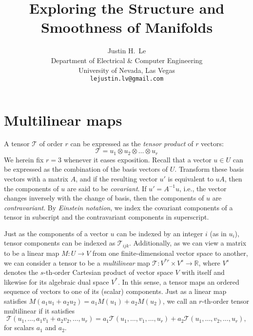 \documentclass{article}
\title{Exploring the Structure and Smoothness of Manifolds}
\author{
    Justin H.~Le \\
    Department of Electrical \& Computer Engineering \\
    University of Nevada, Las Vegas \\
  \texttt{lejustin.lv@gmail.com} \\
}
\begin{document}

\maketitle


\section{Multilinear maps}

A tensor $\mathcal{T}$ of order $r$ can be expressed as the \textit{tensor product} of $r$ vectors:
\begin{equation}
\mathcal{T} = u_1 \otimes u_2 \otimes \ldots \otimes u_r
\end{equation}
We herein fix $r = 3$ whenever it eases exposition. Recall that a vector $u \in U$ can be expressed as the combination of the basis vectors of $U$. Transform these basis vectors with a matrix $A$, and if the resulting vector $u'$ is equivalent to $uA$, then the components of $u$ are said to be \textit{covariant}. If $u' = A^{-1}u$, i.e., the vector changes inversely with the change of basis, then the components of $u$ are \textit{contravariant}. By \textit{Einstein notation}, we index the covariant components of a tensor in subscript and the contravariant components in superscript.

Just as the components of a vector $u$ can be indexed by an integer $i$ (as in $u_i$), tensor components can be indexed as $\mathcal{T}_{ijk}$. Additionally, as we can view a matrix to be a linear map $M: U \rightarrow V$ from one finite-dimensional vector space to another, we can consider a tensor to be a \textit{multilinear} map $\mathcal{T}: V^{*r} \times V^s \rightarrow \mathbb{R}$, where $V^s$ denotes the $s$-th-order Cartesian product of vector space $V$ with itself and likewise for its algebraic dual space $V^*$. In this sense, a tensor maps an ordered sequence of vectors to one of its (scalar) components. Just as a linear map satisfies $M(a_1 u_1 + a_2 u_2) = a_1 M(u_1) + a_2 M(u_2)$, we call an $r$-th-order tensor multilinear if it satisfies
\begin{equation}
\mathcal{T}(u_1, \ldots, a_1 v_1 + a_2 v_2, \ldots, u_r) = a_1 \mathcal{T}(u_1, \ldots, v_1, \ldots, u_r) + a_2 \mathcal{T}(u_1, \ldots, v_2, \ldots, u_r),
\end{equation}
for scalars $a_1$ and $a_2$.
\end{document}
